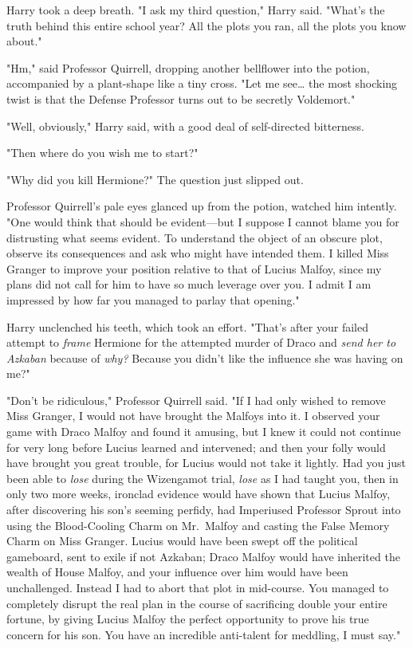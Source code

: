 Harry took a deep breath. "I ask my third question," Harry said. "What's the 
truth behind this entire school year? All the plots you ran, all the plots you 
know about."

"Hm," said Professor Quirrell, dropping another bellflower into the potion, 
accompanied by a plant-shape like a tiny cross. "Let me see{\ldots} the most 
shocking twist is that the Defense Professor turns out to be secretly 
Voldemort."

"Well, obviously," Harry said, with a good deal of self-directed bitterness.

"Then where do you wish me to start?"

"Why did you kill Hermione?" The question just slipped out.

Professor Quirrell's pale eyes glanced up from the potion, watched him 
intently. "One would think that should be evident---but I suppose I cannot 
blame you for distrusting what seems evident. To understand the object of an 
obscure plot, observe its consequences and ask who might have intended them. I 
killed Miss Granger to improve your position relative to that of Lucius Malfoy, 
since my plans did not call for him to have so much leverage over you. I admit 
I am impressed by how far you managed to parlay that opening."

Harry unclenched his teeth, which took an effort. "That's after your failed 
attempt to \emph{frame} Hermione for the attempted murder of Draco and 
\emph{send her to Azkaban} because of \emph{why?} Because you didn't like the 
influence she was having on me?"

"Don't be ridiculous," Professor Quirrell said. "If I had only wished to remove 
Miss Granger, I would not have brought the Malfoys into it. I observed your 
game with Draco Malfoy and found it amusing, but I knew it could not continue 
for very long before Lucius learned and intervened; and then your folly would 
have brought you great trouble, for Lucius would not take it lightly. Had you 
just been able to \emph{lose} during the Wizengamot trial, \emph{lose} as I had 
taught you, then in only two more weeks, ironclad evidence would have shown 
that Lucius Malfoy, after discovering his son's seeming perfidy, had Imperiused 
Professor Sprout into using the Blood-Cooling Charm on Mr.~Malfoy and casting 
the False Memory Charm on Miss Granger. Lucius would have been swept off the 
political gameboard, sent to exile if not Azkaban; Draco Malfoy would have 
inherited the wealth of House Malfoy, and your influence over him would have 
been unchallenged. Instead I had to abort that plot in mid-course. You managed 
to completely disrupt the real plan in the course of sacrificing double your 
entire fortune, by giving Lucius Malfoy the perfect opportunity to prove his 
true concern for his son. You have an incredible anti-talent for meddling, I 
must say."

